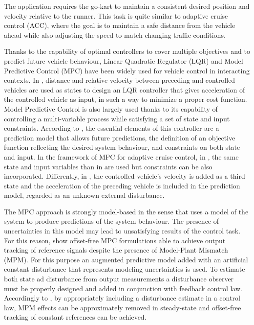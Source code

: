 \documentclass[a4paper,12pt,oneside]{book}
\begin{document}
\bigskip
The application requires the go-kart to maintain a consistent desired position and velocity relative to the runner.
This task is quite similar to adaptive cruise control (ACC), where the goal is to maintain a safe distance from the vehicle ahead while also adjusting the speed to match changing traffic conditions.

\bigskip
Thanks to the capability of optimal controllers to cover multiple objectives and to predict future vehicle behaviour, Linear Quadratic Regulator (LQR) and Model Predictive Control (MPC) have been widely used for vehicle control in interacting contexts.
In \cite{LQR_acc}, distance and relative velocity between preceding and controlled vehicles are used as states to design an LQR controller that gives acceleration of the controlled vehicle as input, in such a way to minimize a proper cost function.
Model Predictive Control is also largely used thanks to its capability of controlling a multi-variable process while satisfying a set of state and input constraints. 
According to \cite{MPC_basics}, the essential elements of this controller are a prediction model that allows future predictions, the definition of an objective function reflecting the desired system behaviour, and constraints on both state and input. 
In the framework of MPC for adaptive cruise control, in \cite{MPC_acc_first}, the same state and input variables than in \cite{LQR_acc} are used but constraints can be also incorporated. 
Differently, in \cite{MPC_acc_second}, the controlled vehicle's velocity is added as a third state and the acceleration of the preceding vehicle is included in the prediction model, regarded as an unknown external disturbance.

\bigskip
The MPC approach is strongly model-based in the sense that uses a model of the system to produce predictions of the system behaviour. 
The presence of uncertainties in this model may lead to unsatisfying results of the control task. 
For this reason, \cite{Offset-free_compare, Linear_offset-free} show offset-free MPC formulations able to achieve output tracking of reference signals despite the presence of Model-Plant Mismatch (MPM).
For this purpose an augmented predictive model added with an artificial constant disturbance that represents modeling uncertainties is used. 
To estimate both state ad disturbance from output measurements a disturbance observer must be properly designed and added in conjunction with feedback control law.
Accordingly to \cite{Disturbance_observer}, by appropriately including a disturbance estimate in a control law, MPM effects can be approximately removed in steady-state and offset-free tracking of constant references can be achieved.
\end{document}
